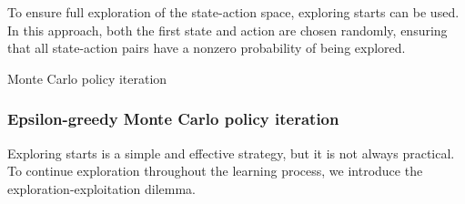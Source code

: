 To ensure full exploration of the state-action space, exploring starts can be used. 
In this approach, both the first state and action are chosen randomly, ensuring that all state-action pairs have a nonzero probability of being explored.
\begin{algorithm}[H]
    \caption{Monte Carlo policy iteration}
        \begin{algorithmic}[1]
            \Loop 
                    \EndIf
                \EndFor
            \EndLoop
        \end{algorithmic}
\end{algorithm}

\subsubsection{Epsilon-greedy Monte Carlo policy iteration}
Exploring starts is a simple and effective strategy, but it is not always practical. 
To continue exploration throughout the learning process, we introduce the exploration-exploitation dilemma.

